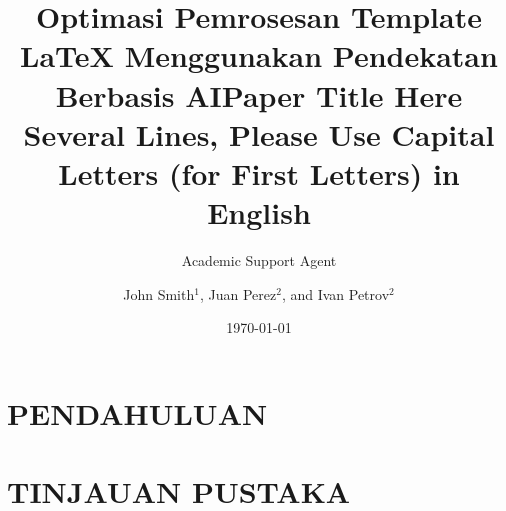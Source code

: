 \documentclass{cys}
\title{Optimasi Pemrosesan Template LaTeX Menggunakan Pendekatan Berbasis AI}
\author{Academic Support Agent}
\date{\today}
\begin{document}
\maketitle

\begin{abstract}

\end{abstract}

\chapter{PENDAHULUAN}


\chapter{TINJAUAN PUSTAKA}


\usepackage[ansinew]{inputenc}

\usepackage{graphicx}



\title{Paper Title Here \\ Several Lines, Please Use Capital Letters (for First Letters) in English}

\author{John Smith$^1$, Juan Perez$^2$, and Ivan Petrov$^2$}

\end{document}
